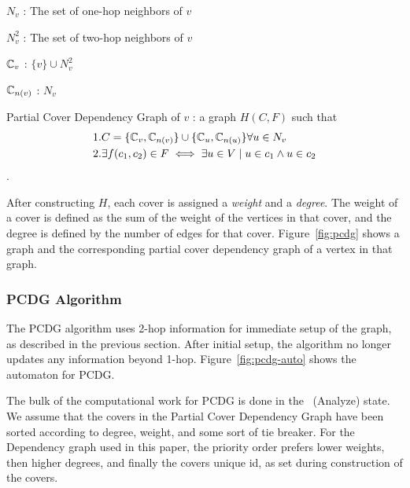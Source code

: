 \documentclass[conference, 10pt]{IEEEtran}
\begin{document}
\begin{defn}
$N_v$ : The set of one-hop neighbors of $v$
\end{defn}
\begin{defn}
$N_v^2$ : The set of two-hop neighbors of $v$ 
\end{defn}

\begin{defn}
${\mathbb C}_v$ : $\{v\} \cup N_v^2$
\end{defn}

\begin{defn}
${\mathbb C}_{n(v)}$ : $N_v$
\end{defn} 

\begin{defn}
Partial Cover Dependency Graph of $v$ : a graph $H(C,F)$ such that \begin{align*}& 1. C = \{{\mathbb C}_v, {\mathbb C}_{n(v)}\} \cup \{{\mathbb C}_u, {\mathbb C}_{n(u)}\} \forall u \in N_v\\ & 2. \exists f(c_1, c_2) \in F \iff \exists u \in V \mid u \in c_1 \land u \in c_2\end{align*}.
\end{defn} 

After constructing $H$, each cover is assigned a {\em weight} and a {\em degree}. The weight of a cover is defined as the sum of the weight of the vertices in that cover, and the degree is defined by the number of edges for that cover. Figure~\ref{fig:pcdg} shows a graph and the corresponding partial cover dependency graph of a vertex in that graph.



\subsubsection{PCDG Algorithm}
\label{sec:pcdg-alg}

The PCDG algorithm uses 2-hop information for immediate setup of the graph, as described in the previous section. After initial setup, the algorithm no longer updates any information beyond 1-hop. Figure~\ref{fig:pcdg-auto} shows the automaton for PCDG.



The bulk of the computational work for PCDG is done in the \cAd\ (Analyze) state. We assume that the covers in the Partial Cover Dependency Graph have been sorted according to degree, weight, and some sort of tie breaker. For the Dependency graph used in this paper, the priority order prefers lower weights, then higher degrees, and finally the covers unique id, as set during construction of the covers.
\end{document}
